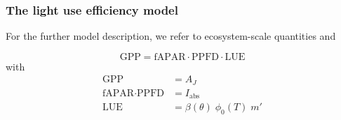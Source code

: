 \documentclass{myreport}
\begin{document}



\subsubsection{The light use efficiency model}
\label{sec:luemodel}
For the further model description, we refer to ecosystem-scale quantities and 

\begin{equation}
\text{GPP} = \text{fAPAR} \cdot \text{PPFD} \cdot \text{LUE}
\label{eq:luemodel}
\end{equation}
with 
\begin{align}
    \text{GPP} &= A_J \\
    \text{fAPAR} \cdot \text{PPFD} &= I_{\text{abs}} \\
    \text{LUE} &= \beta(\theta) \; \phi_0(T) \; m'
\end{align}
\end{document}
